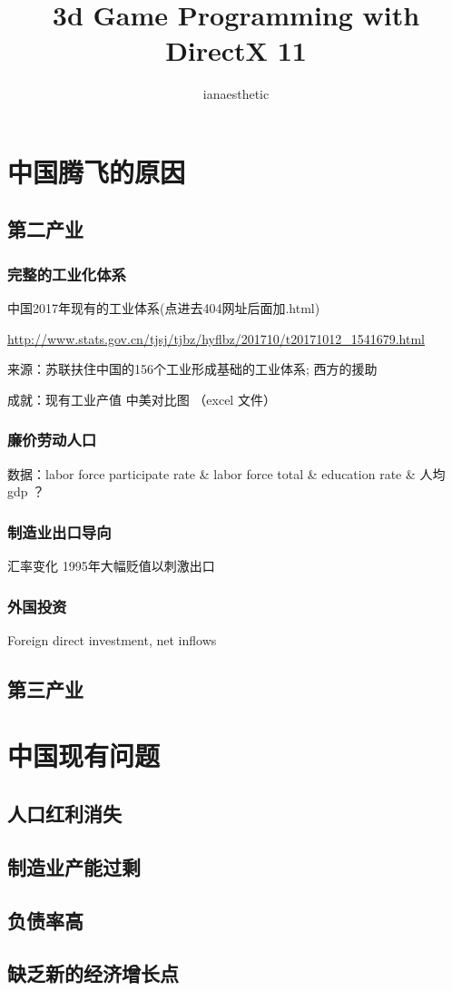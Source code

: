 \documentclass[10pt, a4paper]{article}
\author{ianaesthetic}
\title{3d Game Programming with DirectX 11}
\begin{document}
    \section{中国腾飞的原因}
        \subsection{第二产业}
        \subsubsection{完整的工业化体系}
            中国2017年现有的工业体系(点进去404网址后面加.html)

            \url{http://www.stats.gov.cn/tjsj/tjbz/hyflbz/201710/t20171012_1541679.html}
    
            来源：苏联扶住中国的156个工业形成基础的工业体系; 西方的援助
            
            成就：现有工业产值 中美对比图 （excel 文件）
        \subsubsection{廉价劳动人口}
            数据：labor force participate rate \& labor force total \& education rate \& 人均gdp ？ 

        \subsubsection{制造业出口导向}
            汇率变化 1995年大幅贬值以刺激出口
        \subsubsection{外国投资}
            Foreign direct investment, net inflows
        \subsection{第三产业}
\section{中国现有问题}
    \subsection{人口红利消失}
    \subsection{制造业产能过剩}
    \subsection{负债率高}
    \subsection{缺乏新的经济增长点}
\end{document}
